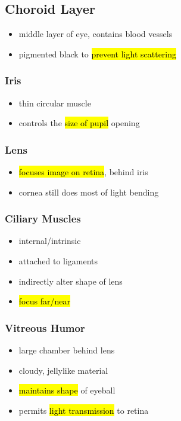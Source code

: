 \documentclass[a4paper,12pt]{article}
\begin{document}
\subsection{Choroid Layer}
\begin{itemize}
    \item{middle layer of eye, contains blood vessels}
    \item{pigmented black to \hl{prevent light scattering}}
\end{itemize}

\subsubsection{Iris}
\begin{itemize}
    \item{thin circular muscle}
    \item{controls the \hl{size of pupil} opening}
\end{itemize}

\subsubsection{Lens}
\begin{itemize}
    \item{\hl{focuses image on retina}, behind iris}
    \item{cornea still does most of light bending}
\end{itemize}

\subsubsection{Ciliary Muscles}
\begin{itemize}
    \item{internal/intrinsic}
    \item{attached to ligaments}
    \item{indirectly alter shape of lens}
    \item{\hl{focus far/near}}
\end{itemize}

\subsubsection{Vitreous Humor}
\begin{itemize}
    \item{large chamber behind lens}
    \item{cloudy, jellylike material}
    \item{\hl{maintains shape} of eyeball}
    \item{permits \hl{light transmission} to retina}
\end{itemize}
\end{document}
